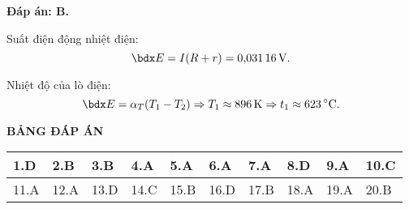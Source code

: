 \begin{enumerate}[label=\bfseries Câu \arabic*:]
{}
\loigiai
{	\textbf{Đáp án: B.}
	
	Suất điện động nhiệt điện:
	$$\calE = I (R+r) = \SI{0.03116}{V}.$$
	
	Nhiệt độ của lò điện:
	$$\calE = \alpha_T (T_1 - T_2) \Rightarrow T_1 \approx \SI{896}{K} \Rightarrow t_1 \approx \SI{623}{\celsius}.$$
}
\end{enumerate}

\whiteBGstarEnd

\loigiai
{
	\begin{center}
		\textbf{BẢNG ĐÁP ÁN}
	\end{center}
	\begin{center}
		\begin{tabular}{|m{2.8em}|m{2.8em}|m{2.8em}|m{2.8em}|m{2.8em}|m{2.8em}|m{2.8em}|m{2.8em}|m{2.8em}|m{2.8em}|}
			\hline
			1.D  & 2.B  & 3.B  & 4.A  & 5.A  & 6.A  & 7.A  & 8.D  & 9.A  & 10.C  \\
			\hline
			11.A  & 12.A  & 13.D  & 14.C  & 15.B  & 16.D  & 17.B  & 18.A  & 19.A  & 20.B  \\
			\hline
		\end{tabular}
	\end{center}
}
